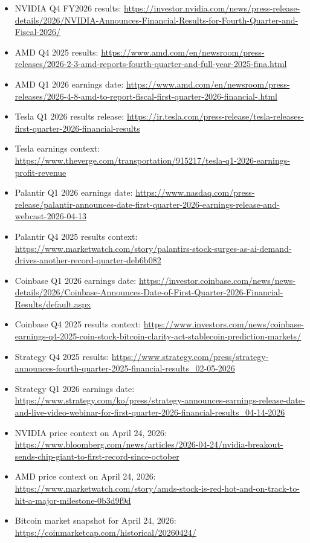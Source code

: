 \documentclass[11pt]{article}
\begin{document}
\begin{itemize}
  \item NVIDIA Q4 FY2026 results: \url{https://investor.nvidia.com/news/press-release-details/2026/NVIDIA-Announces-Financial-Results-for-Fourth-Quarter-and-Fiscal-2026/}
  \item AMD Q4 2025 results: \url{https://www.amd.com/en/newsroom/press-releases/2026-2-3-amd-reports-fourth-quarter-and-full-year-2025-fina.html}
  \item AMD Q1 2026 earnings date: \url{https://www.amd.com/en/newsroom/press-releases/2026-4-8-amd-to-report-fiscal-first-quarter-2026-financial-.html}
  \item Tesla Q1 2026 results release: \url{https://ir.tesla.com/press-release/tesla-releases-first-quarter-2026-financial-results}
  \item Tesla earnings context: \url{https://www.theverge.com/transportation/915217/tesla-q1-2026-earnings-profit-revenue}
  \item Palantir Q1 2026 earnings date: \url{https://www.nasdaq.com/press-release/palantir-announces-date-first-quarter-2026-earnings-release-and-webcast-2026-04-13}
  \item Palantir Q4 2025 results context: \url{https://www.marketwatch.com/story/palantirs-stock-surges-as-ai-demand-drives-another-record-quarter-deb6b082}
  \item Coinbase Q1 2026 earnings date: \url{https://investor.coinbase.com/news/news-details/2026/Coinbase-Announces-Date-of-First-Quarter-2026-Financial-Results/default.aspx}
  \item Coinbase Q4 2025 results context: \url{https://www.investors.com/news/coinbase-earnings-q4-2025-coin-stock-bitcoin-clarity-act-stablecoin-prediction-markets/}
  \item Strategy Q4 2025 results: \url{https://www.strategy.com/press/strategy-announces-fourth-quarter-2025-financial-results_02-05-2026}
  \item Strategy Q1 2026 earnings date: \url{https://www.strategy.com/ko/press/strategy-announces-earnings-release-date-and-live-video-webinar-for-first-quarter-2026-financial-results_04-14-2026}
  \item NVIDIA price context on April 24, 2026: \url{https://www.bloomberg.com/news/articles/2026-04-24/nvidia-breakout-sends-chip-giant-to-first-record-since-october}
  \item AMD price context on April 24, 2026: \url{https://www.marketwatch.com/story/amds-stock-is-red-hot-and-on-track-to-hit-a-major-milestone-0b3d9f9d}
  \item Bitcoin market snapshot for April 24, 2026: \url{https://coinmarketcap.com/historical/20260424/}
\end{itemize}
\end{document}
